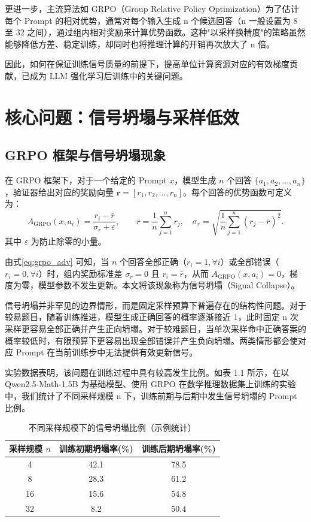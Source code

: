 更进一步，主流算法如 GRPO（Group Relative Policy Optimization）为了估计每个 Prompt 的相对优势，通常对每个输入生成 n 个候选回答（n 一般设置为 8 至 32 之间），通过组内相对奖励来计算优势函数。这种"以采样换精度"的策略虽然能够降低方差、稳定训练，却同时也将推理计算的开销再次放大了 n 倍。

因此，如何在保证训练信号质量的前提下，提高单位计算资源对应的有效梯度贡献，已成为 LLM 强化学习后训练中的关键问题。


\section{核心问题：信号坍塌与采样低效}

\subsection{GRPO 框架与信号坍塌现象}

在 GRPO 框架下，对于一个给定的 Prompt $x$，模型生成 $n$ 个回答 $\{a_1,a_2,\ldots,a_n\}$，验证器给出对应的奖励向量 $\mathbf{r}=[r_1,r_2,\ldots,r_n]$。每个回答的优势函数可定义为：
\begin{equation}
\label{eq:grpo_adv}
A_{\mathrm{GRPO}}(x,a_i) = \frac{r_i-\bar r}{\sigma_r+\varepsilon},\qquad
\bar r = \frac{1}{n}\sum_{j=1}^{n} r_j,\quad
\sigma_r = \sqrt{\frac{1}{n}\sum_{j=1}^{n}(r_j-\bar r)^2}.
\end{equation}
其中 $\varepsilon$ 为防止除零的小量。

由式\eqref{eq:grpo_adv} 可知，当 $n$ 个回答全部正确（$r_i=1,\forall i$）或全部错误（$r_i=0,\forall i$）时，组内奖励标准差 $\sigma_r=0$ 且 $r_i=\bar r$，从而 $A_{\mathrm{GRPO}}(x,a_i)=0$，梯度为零，模型参数不发生更新。本文将该现象称为信号坍塌（Signal Collapse）。

信号坍塌并非罕见的边界情形，而是固定采样预算下普遍存在的结构性问题。对于较易题目，随着训练推进，模型生成正确回答的概率逐渐接近 1，此时固定 n 次采样更容易全部正确并产生正向坍塌。对于较难题目，当单次采样命中正确答案的概率较低时，有限预算下更容易出现全部错误并产生负向坍塌。两类情形都会使对应 Prompt 在当前训练步中无法提供有效更新信号。

实验数据表明，该问题在训练过程中具有较高发生比例。如表 1.1 所示，在以 Qwen2.5-Math-1.5B 为基础模型、使用 GRPO 在数学推理数据集上训练的实验中，我们统计了不同采样规模 n 下，训练前期与后期中发生信号坍塌的 Prompt 比例。

\begin{table}[htbp]
\centering
\caption{不同采样规模下的信号坍塌比例（示例统计）}
\label{tab:collapse_ratio}
\small
\begin{tabular}{ccc}
\hline
采样规模 $n$ & 训练初期坍塌率(\%) & 训练后期坍塌率(\%) \\
\hline
4  & 42.1 & 78.5 \\
8  & 28.3 & 61.2 \\
16 & 15.6 & 54.8 \\
32 & 8.2  & 50.4 \\
\hline
\end{tabular}
\end{table}

